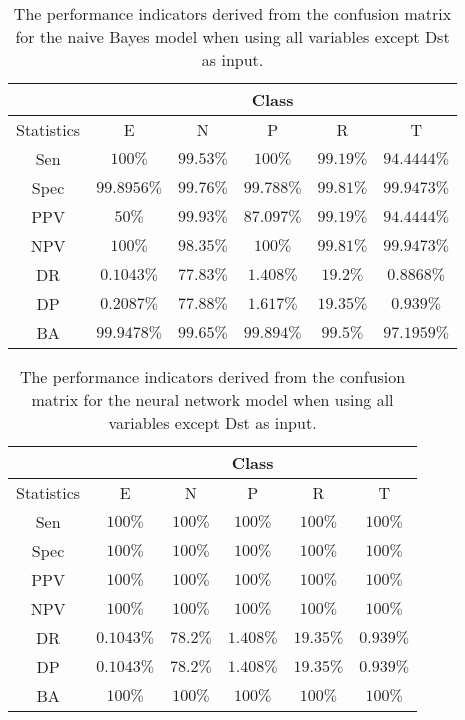 \begin{table}[!ht]
	\centering
	\begin{tabular}{|c|c|c|c|c|c|}
		\hline
		 & \multicolumn{5}{c|}{Class} \\ \hline
		Statistics & E & N & P & R & T \\ \hline
		Sen & $100\%$ & $99.53\%$ & $100\%$ & $99.19\%$ & $94.4444\%$ \\ \hline
		Spec & $99.8956\%$ & $99.76\%$ & $99.788\%$ & $99.81\%$ & $99.9473\%$ \\ \hline
		PPV & $50\%$ & $99.93\%$ & $87.097\%$ & $99.19\%$ & $94.4444\%$ \\ \hline
		NPV & $100\%$ & $98.35\%$ & $100\%$ & $99.81\%$ & $99.9473\%$ \\ \hline
		DR & $0.1043\%$ & $77.83\%$ & $1.408\%$ & $19.2\%$ & $0.8868\%$ \\ \hline
		DP & $0.2087\%$ & $77.88\%$ & $1.617\%$ & $19.35\%$ & $0.939\%$ \\ \hline
		BA & $99.9478\%$ & $99.65\%$ & $99.894\%$ & $99.5\%$ & $97.1959\%$ \\ \hline
	\end{tabular}
	\caption{The performance indicators derived from the confusion matrix for the naive Bayes model when using all variables except Dst as input.}
	\label{tab:cs:reverse:noDst:nb}
\end{table}

\begin{table}[!ht]
	\centering
	\begin{tabular}{|c|c|c|c|c|c|}
		\hline
		 & \multicolumn{5}{c|}{Class} \\ \hline
		Statistics & E & N & P & R & T \\ \hline
		Sen & $100\%$ & $100\%$ & $100\%$ & $100\%$ & $100\%$ \\ \hline
		Spec & $100\%$ & $100\%$ & $100\%$ & $100\%$ & $100\%$ \\ \hline
		PPV & $100\%$ & $100\%$ & $100\%$ & $100\%$ & $100\%$ \\ \hline
		NPV & $100\%$ & $100\%$ & $100\%$ & $100\%$ & $100\%$ \\ \hline
		DR & $0.1043\%$ & $78.2\%$ & $1.408\%$ & $19.35\%$ & $0.939\%$ \\ \hline
		DP & $0.1043\%$ & $78.2\%$ & $1.408\%$ & $19.35\%$ & $0.939\%$ \\ \hline
		BA & $100\%$ & $100\%$ & $100\%$ & $100\%$ & $100\%$ \\ \hline
	\end{tabular}
	\caption{The performance indicators derived from the confusion matrix for the neural network model when using all variables except Dst as input.}
	\label{tab:cs:reverse:noDst:nnet}
\end{table}

